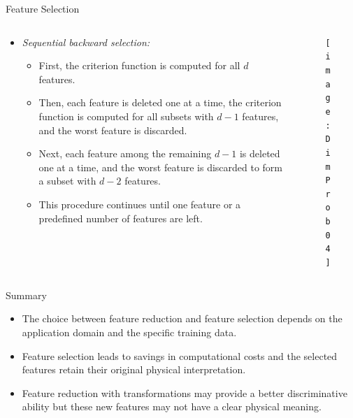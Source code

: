\begin{frame}{Feature Selection}
\begin{columns}
\begin{column}{7cm}
\begin{itemize}
\item \textit{\color{mycolor2}Sequential backward selection:}
\begin{itemize}
\item First, the criterion function is computed for all $d$ features.
\item Then, each feature is deleted one at a time, the criterion
function is computed for all subsets with $d - 1$ features, and
the worst feature is discarded.
\item Next, each feature among the remaining $d - 1$ is deleted one
at a time, and the worst feature is discarded to form a subset
with $d - 2$ features.
\item This procedure continues until one feature or a predefined
number of features are left.
\end{itemize}
\end{itemize}
\end{column}
\begin{column}{7cm}
\begin{figure}
\texttt{[image: DimProb04]}
\end{figure}
\end{column}
\end{columns}
\end{frame}

\begin{frame}{Summary}
\begin{itemize}
\item The choice between feature reduction and feature selection
depends on the application domain and the specific training
data.
\item Feature selection leads to savings in computational costs
and the selected features retain their original physical
interpretation.
\item Feature reduction with transformations may provide a better
discriminative ability but these new features may not have a
clear physical meaning.
\end{itemize}
\end{frame}

